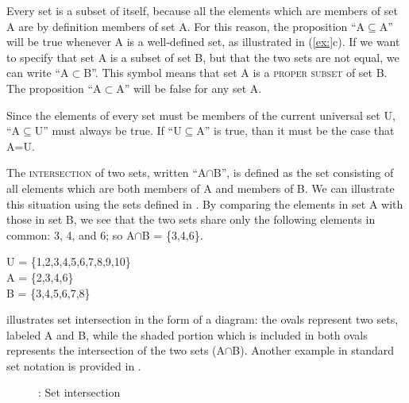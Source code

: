 Every set is a subset of itself, because all the elements which are members of set A are by definition members of set A. For this reason, the proposition “A${\subseteq}$A” will be true whenever A is a well-defined set, as illustrated in (\ref{ex:}c). If we want to specify that set A is a subset of set B, but that the two sets are not equal, we can write “A${\subset}$B”. This symbol means that set A is a \textsc{proper subset} of set B. The proposition “A${\subset}$A” will be false for any set A.



Since the elements of every set must be members of the current universal set U, “A${\subseteq}$U” must always be true. If “U${\subseteq}$A” is true, than it must be the case that A=U.



The \textsc{intersection} of two sets, written “A${\cap}$B”, is defined as the set consisting of all elements which are both members of A and members of B. We can illustrate this situation using the sets defined in . By comparing the elements in set A with those in set B, we see that the two sets share only the following elements in common: 3, 4, and 6; so A${\cap}$B = \{3,4,6\}.


\ea
U = \{1,2,3,4,5,6,7,8,9,10\}\\
A = \{2,3,4,6\}\\
B = \{3,4,5,6,7,8\}
\z


 illustrates set intersection in the form of a diagram: the ovals represent two sets, labeled A and B, while the shaded portion which is included in both ovals represents the intersection of the two sets (A${\cap}$B). Another example in standard set notation is provided in .

\begin{figure}
 


\caption{\label{fig:key:2}: Set intersection}
\end{figure}

